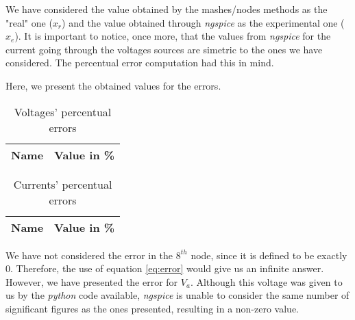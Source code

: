 We have considered the value obtained by the mashes/nodes methods as the "real" one ($x_r$) and the value obtained through \emph{ngspice} as the experimental one ($x_e$). It is important to notice, once more, that the values from \emph{ngspice} for the current going through the voltages sources are simetric to the ones we have considered. The percentual error computation had this in mind.

Here, we present the obtained values for the errors.

\begin{table}[H]
  \centering
  \begin{tabular}{|l|r|}
    \hline
    {\bf Name} & {\bf Value in \%} \\ \hline
  \end{tabular}
  \caption{Voltages' percentual errors}
  \label{tab:error_tensoes}
\end{table}



\begin{table}[H]
  \centering
  \begin{tabular}{|l|r|}
    \hline
    {\bf Name} & {\bf Value in \%} \\ \hline
  \end{tabular}
  \caption{Currents' percentual errors }
  \label{tab:error_current}
\end{table}

We have not considered the error in the $8^{th}$ node, since it is defined to be exactly 0. Therefore, the use of equation \ref{eq:error} would give us an infinite answer. However, we have presented the error for $V_a$. Although this voltage was given to us by the \emph{python} code available, \emph{ngspice} is unable to consider the same number of significant figures as the ones presented, resulting in a non-zero value.
